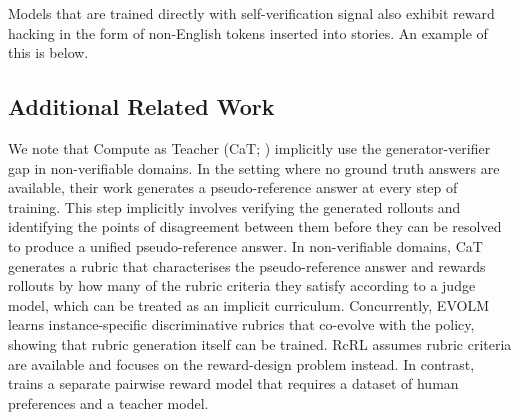 \documentclass{article}
\theoremstyle{plain}
\theoremstyle{definition}
\theoremstyle{remark}
\begin{document}
Models that are trained directly with self-verification signal also exhibit reward hacking in the form of non-English tokens inserted into stories. An example of this is below.


\subsection{Additional Related Work}
We note that Compute as Teacher (CaT; \citealp{jayalath2026computeteacherturninginference}) implicitly use the generator-verifier gap in non-verifiable domains. In the setting where no ground truth answers are available, their work generates a pseudo-reference answer at every step of training. This step implicitly involves verifying the generated rollouts and identifying the points of disagreement between them before they can be resolved to produce a unified pseudo-reference answer. In non-verifiable domains, CaT generates a rubric that characterises the pseudo-reference answer and rewards rollouts by how many of the rubric criteria they satisfy according to a judge model, which can be treated as an implicit curriculum. Concurrently, EVOLM \citep{li2026evolmselfevolvinglanguagemodels} learns instance-specific discriminative rubrics that co-evolve with the policy, showing that rubric generation itself can be trained. RcRL assumes rubric criteria are available and focuses on the reward-design problem instead. In contrast, \citep{jia2025writingzerobridgegapnonverifiable} trains a separate pairwise reward model that requires a dataset of human preferences and a teacher model.
\end{document}
